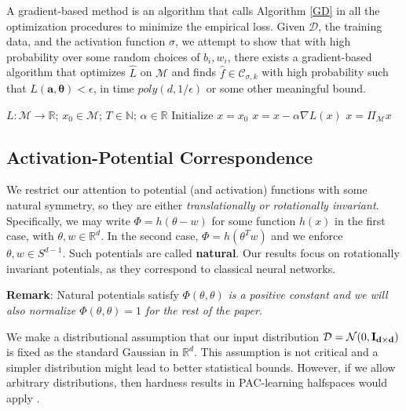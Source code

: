 \documentclass{article}
\newcommand{\N}{{\mathbb{N}}}
\newcommand{\R}{{\mathbb{R}}}
\begin{document}
A gradient-based method is an algorithm that calls Algorithm \ref{GD}
in all the optimization procedures to minimize the empirical
loss. Given $\mathcal{D}$, the training data, and the activation
function $\sigma$, we attempt to show that with high probability over
some random choices of $b_i, w_i$, there exists a gradient-based
algorithm that optimizes $\widehat{L}$ on $\mathcal{M}$ and finds
$\widehat{f} \in \mathcal{C}_{\sigma, k}$ with high probability such
that $L(\boldsymbol{a,\theta}) <\epsilon$, in time $poly(d,1/\epsilon)$ or some
other meaningful bound.

\begin{algorithm}[hb]
 \caption{$x = GradientDescent(L,x_0, T,\alpha$)}
   \label{GD}
\begin{algorithmic}
    $L: \mathcal{M} \to \R$; $x_0 \in \mathcal{M}$; $T\in \N$; $\alpha\in \R$
   \STATE Initialize $x = x_0$
   \STATE $x = x - \alpha\nabla L(x)$
   \STATE $x = \Pi_\mathcal{M} x$
   \ENDFOR
\end{algorithmic}
\end{algorithm}

\subsection{Activation-Potential Correspondence}
We restrict our attention to potential (and activation) functions with some natural symmetry, so they are either {\it translationally or rotationally invariant}. Specifically, we may write $\Phi= h(\theta-w)$ for some function $h(x)$  in the first case, with $\theta, w \in \R^d$. In the second case, $\Phi = h(\theta^Tw)$ and we enforce $\theta, w \in S^{d-1}$. Such potentials are called {\bf natural}. Our results focus on rotationally invariant potentials, as they correspond to classical neural networks.

{\bf Remark}: Natural potentials satisfy $\Phi(\theta,\theta)$ {\it is a positive constant and we will also normalize $\Phi(\theta,\theta) = 1$ for the rest of the paper.} 

We make a distributional assumption that our input distribution
$\mathcal{D} = \mathcal{N}(0, {\bf I_{d\times d}})$ is fixed as the
standard Gaussian in $\R^d$. This assumption is not critical and a
simpler distribution might lead to better statistical bounds. However, if we allow arbitrary distributions, then hardness results in PAC-learning
halfspaces would apply \cite{klivans2006cryptographic}.
\end{document}

